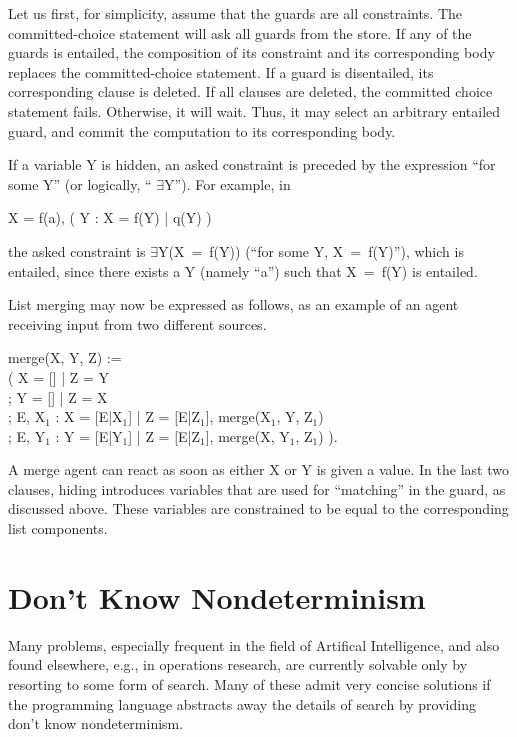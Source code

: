 Let us first, for simplicity, assume that the guards are all
constraints.  The commit\-ted-choice statement will ask all guards
from the store.  If any of the guards is entailed, the composition of
its constraint and its corresponding body replaces the
committed-choice statement.  If a guard is disentailed, its
corresponding clause is deleted.  If all clauses are deleted, the
committed choice statement fails.  Otherwise, it will wait.  Thus, it
may select an arbitrary entailed guard, and commit the computation to
its corresponding body.

If a variable Y is hidden, an asked constraint is preceded by the
expression ``for some {\prog Y}'' (or logically, ``{\prog
$\exists$Y}'').  For example, in
%
\begin{progex}
X = f(a), ( Y : X = f(Y) | q(Y) )
\end{progex}%
%
the asked constraint is {\prog $\exists$Y(X~=~f(Y))} (``for some
{\prog Y}, {\prog X~=~f(Y)}''), which is entailed, since there exists
a {\prog Y} (namely ``{\prog a}'') such that {\prog X~=~f(Y)} is
entailed.

List merging may now be expressed as follows, as an example of an agent 
receiving input from two different sources.
%
\begin{program}
merge(X, Y, Z) := \\
\>\>( X = [] | Z = Y \\
\>\>; Y = [] | Z = X \\
\>\>; E, X$_1$ : X = [E|X$_1$] | Z = [E|Z$_1$], merge(X$_1$, Y, Z$_1$) \\
\>\>; E, Y$_1$ : Y = [E|Y$_1$] | Z = [E|Z$_1$], merge(X, Y$_1$, Z$_1$) ).
\end{program}%
%
A merge agent can react as soon as either {\prog X} or {\prog Y} is
given a value.  In the last two clauses, hiding introduces variables
that are used for ``matching'' in the guard, as discussed above.
These variables are constrained to be equal to the corresponding list
components.

\section{Don't Know Nondeterminism}

Many problems, especially frequent in the field of Artifical
Intelligence, and also found elsewhere, e.g., in operations research,
are currently solvable only by resorting to some form of search.  Many
of these admit very concise solutions if the programming language
abstracts away the details of search by providing don't know
nondeterminism.

